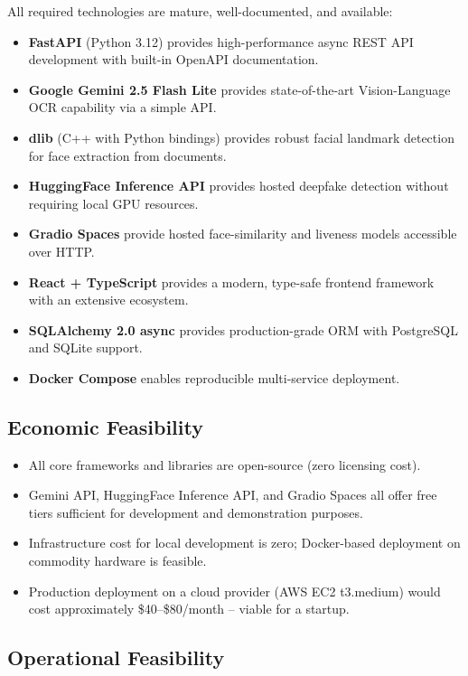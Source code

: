\documentclass[12pt,a4paper]{report}
\begin{document}
All required technologies are mature, well-documented, and available:
\begin{itemize}
    \item \textbf{FastAPI} (Python 3.12) provides high-performance async REST API development with built-in OpenAPI documentation.
    \item \textbf{Google Gemini 2.5 Flash Lite} provides state-of-the-art Vision-Language OCR capability via a simple API.
    \item \textbf{dlib} (C++ with Python bindings) provides robust facial landmark detection for face extraction from documents.
    \item \textbf{HuggingFace Inference API} provides hosted deepfake detection without requiring local GPU resources.
    \item \textbf{Gradio Spaces} provide hosted face-similarity and liveness models accessible over HTTP.
    \item \textbf{React + TypeScript} provides a modern, type-safe frontend framework with an extensive ecosystem.
    \item \textbf{SQLAlchemy 2.0 async} provides production-grade ORM with PostgreSQL and SQLite support.
    \item \textbf{Docker Compose} enables reproducible multi-service deployment.
\end{itemize}

\subsection{Economic Feasibility}

\begin{itemize}
    \item All core frameworks and libraries are open-source (zero licensing cost).
    \item Gemini API, HuggingFace Inference API, and Gradio Spaces all offer free tiers sufficient for development and demonstration purposes.
    \item Infrastructure cost for local development is zero; Docker-based deployment on commodity hardware is feasible.
    \item Production deployment on a cloud provider (AWS EC2 t3.medium) would cost approximately \$40--\$80/month -- viable for a startup.
\end{itemize}

\subsection{Operational Feasibility}
\end{document}
